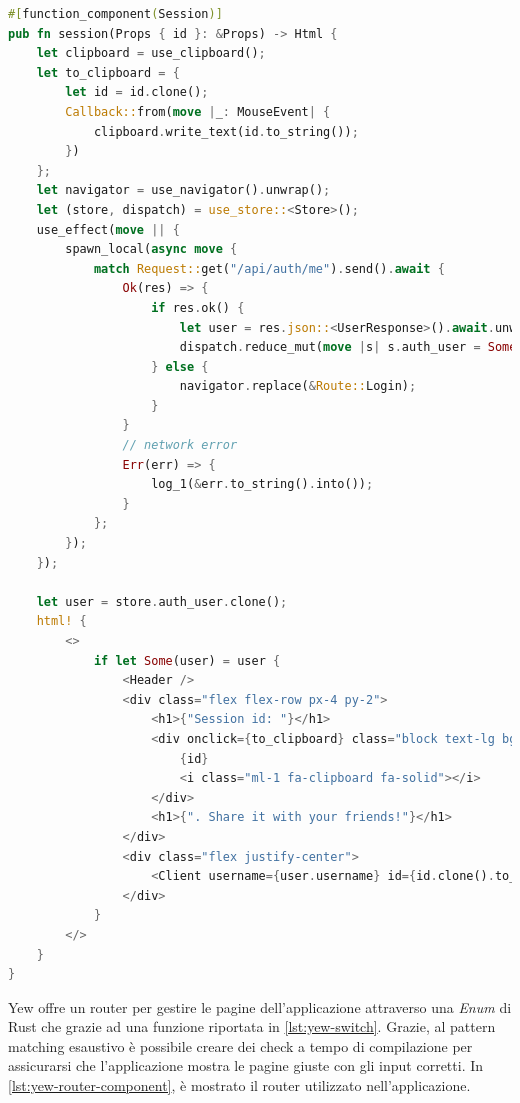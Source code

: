 \documentclass{article}
\begin{document}
\begin{lstlisting}[language=Rust, style=boxed, label={lst:yew-function-component}, captionpos=b,caption={Esempio di componente funzionale}]
#[function_component(Session)]
pub fn session(Props { id }: &Props) -> Html {
    let clipboard = use_clipboard();
    let to_clipboard = {
        let id = id.clone();
        Callback::from(move |_: MouseEvent| {
            clipboard.write_text(id.to_string());
        })
    };
    let navigator = use_navigator().unwrap();
    let (store, dispatch) = use_store::<Store>();
    use_effect(move || {
        spawn_local(async move {
            match Request::get("/api/auth/me").send().await {
                Ok(res) => {
                    if res.ok() {
                        let user = res.json::<UserResponse>().await.unwrap();
                        dispatch.reduce_mut(move |s| s.auth_user = Some(user.into()));
                    } else {
                        navigator.replace(&Route::Login);
                    }
                }
                // network error
                Err(err) => {
                    log_1(&err.to_string().into());
                }
            };
        });
    });

    let user = store.auth_user.clone();
    html! {
        <>
            if let Some(user) = user {
                <Header />
                <div class="flex flex-row px-4 py-2">
                    <h1>{"Session id: "}</h1>
                    <div onclick={to_clipboard} class="block text-lg bg-gray-600 cursor-pointer ">
                        {id}
                        <i class="ml-1 fa-clipboard fa-solid"></i>
                    </div>
                    <h1>{". Share it with your friends!"}</h1>
                </div>
                <div class="flex justify-center">
                    <Client username={user.username} id={id.clone().to_string()}/>
                </div>
            }
        </>
    }
}
\end{lstlisting}
Yew offre un router per gestire le pagine dell'applicazione attraverso una \textit{Enum} di 
Rust che grazie ad una funzione riportata in \cref{lst:yew-switch}. Grazie, al pattern matching esaustivo è possibile creare dei check a tempo di compilazione 
per assicurarsi che l'applicazione mostra le pagine giuste con gli input corretti. In
\cref{lst:yew-router-component}, è mostrato il router utilizzato nell'applicazione. 
\end{document}
